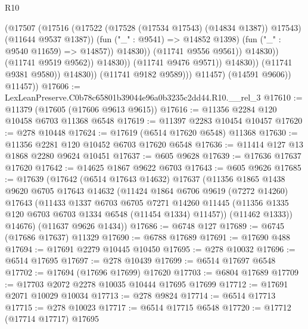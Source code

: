 \begin{lexlean}{R10}
\begin{coremodule}
                                            (@17507
                                              (@17516
                                                (@17522
                                                  (@17528 (@17534 @17543) (@14834 @1387))
                                                  @17543)
                                                (@11644 @9537 @1387))
                                              (fun ("_" : @9541) => @14852 @1398)
                                              (fun ("_" : @9540 @11659) => @14857))
                                            @14830))
                                        (@11741 @9556 @9561))
                                      @14830))
                                  (@11741 @9519 @9562))
                                @14830))
                            (@11741 @9476 @9571))
                          @14830))
                      (@11741 @9381 @9580))
                    @14830))
                (@11741 @9182 @9589)))
            @11457)
          (@14591 @9606))
        @11457))
@17606 := LexLeanPreserve.C0b78c65801b39044e96a0b3235c2dd44.R10.__rel_3
@17610 := @11379 (@17605 (@17606 @9613 @9615))
@17616 := @11356 @2284 @120 @10458 @6703 @11368 @6548
@17619 := @11397 @2283 @10454 @10457
@17620 := @278 @10448
@17624 := @17619 (@6514 @17620 @6548) @11368
@17630 := @11356 @2281 @120 @10452 @6703 @17620 @6548
@17636 := @11414 @127 @13 @1868 @2280 @9624 @10451
@17637 := @605 @9628
@17639 := @17636 @17637 @17620
@17642 := @14625 @1867 @9622 @6703
@17643 := @605 @9626
@17685 := @17639
    (@17642
      (@6514 @17643 @14632)
      @17637
      (@11356
        @1865
        @1438
        @9620
        @6705
        @17643
        @14632
        (@11424
          @1864
          @6706
          @9619
          (@7272 @14260)
          @17643
          (@11433
            @1337
            @6703
            @6705
            @7271
            @14260
            @11445
            (@11356 @1335 @120 @6703 @6703 @1334 @6548 (@11454 @1334) @11457))
          (@11462 @1333))
        @14676)
      (@11637 @9626 @1434))
@17686 := @6748 @127
@17689 := @6745 (@17686 @17637) @11329
@17690 := @6788 @17689
@17691 := @17690 @488
@17694 := @17691 @2279 @10445 @10450
@17695 := @278 @10032
@17696 := @6514 @17695
@17697 := @278 @10439
@17699 := @6514 @17697 @6548
@17702 := @17694 (@17696 @17699) @17620
@17703 := @6804 @17689
@17709 := @17703 @2072 @2278 @10035 @10444 @17695 @17699
@17712 := @17691 @2071 @10029 @10034
@17713 := @278 @9824
@17714 := @6514 @17713
@17715 := @278 @10023
@17717 := @6514 @17715 @6548
@17720 := @17712 (@17714 @17717) @17695

\end{coremodule}
\end{lexlean}
